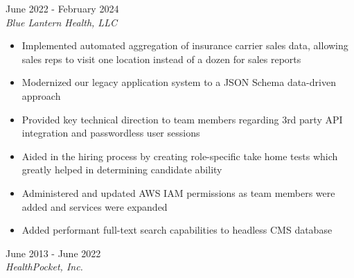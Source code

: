 \documentclass{resume}
\begin{document}
\begin{spacing}{1.2}
\begin{paracol}{2}
		\switchcolumn
		\small {}
		
		{\large{}}
		\hfill{\color{subcontent} June 2022 - February 2024}\\
		\textit{Blue Lantern Health, LLC}
		
		\nointerlineskip
		\begin{itemize}
			\item Implemented automated aggregation of insurance carrier sales data, allowing sales reps to visit one location instead of a dozen for sales reports
			\item Modernized our legacy application system to a JSON Schema data-driven approach
			\item Provided key technical direction to team members regarding 3rd party API integration and passwordless user sessions
			\item Aided in the hiring process by creating role-specific take home tests which greatly helped in determining candidate ability
			\item Administered and updated AWS IAM permissions as team members were added and services were expanded
			\item Added performant full-text search capabilities to headless CMS database
		\end{itemize}

		\medskip

		{\large{}}
		\hfill{\color{subcontent} June 2013 - June 2022}\\
		\textit{HealthPocket, Inc.}


\end{paracol}
\end{spacing}
\end{document}
